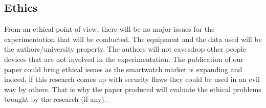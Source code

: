 \subsection{Ethics}
From an ethical point of view, there will be no major issues for the experimentation that will be conducted. The equipment and the data used will be the authors/university property. The authors will not eavesdrop other people devices that are not involved in the experimentation.
The publication of our paper could bring ethical issues as the smartwatch market is expanding and indeed, if this research comes up with security flaws they could be used in an evil way by others. That is why the paper produced will evaluate the ethical problems brought by the research (if any).